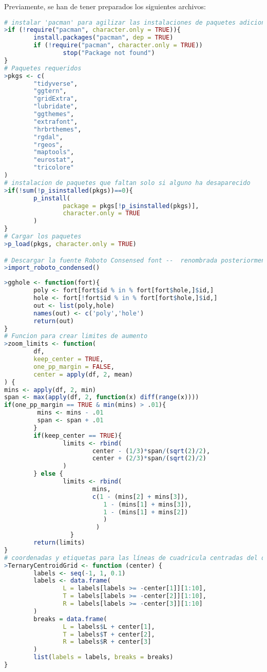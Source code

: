 \noindent Previamente, se han de tener preparados los siguientes archivos:

\begin{lstlisting}[language=R, caption=C\'odigo 0 para preparar la sesi\'on.]
# instalar 'pacman' para agilizar las instalaciones de paquetes adicionales
>if (!require("pacman", character.only = TRUE)){
        install.packages("pacman", dep = TRUE)
        if (!require("pacman", character.only = TRUE))
                stop("Package not found")
}
# Paquetes requeridos
>pkgs <- c(
        "tidyverse", 
        "ggtern",
        "gridExtra",
        "lubridate",
        "ggthemes",
        "extrafont",
        "hrbrthemes",
        "rgdal",
        "rgeos",
        "maptools",
        "eurostat",
        "tricolore"
)
# instalacion de paquetes que faltan solo si alguno ha desaparecido
>if(!sum(!p_isinstalled(pkgs))==0){
        p_install(
                package = pkgs[!p_isinstalled(pkgs)], 
                character.only = TRUE
        )
}
# Cargar los paquetes
>p_load(pkgs, character.only = TRUE)

# Descargar la fuente Roboto Consensed font --  renombrada posteriormente 'myfont'
>import_roboto_condensed()
\end{lstlisting}

\begin{lstlisting}[language=R, caption=C\'odigo 1 con las funciones propias.]
>gghole <- function(fort){
        poly <- fort[fort$id % in % fort[fort$hole,]$id,]
        hole <- fort[!fort$id % in % fort[fort$hole,]$id,]
        out <- list(poly,hole)
        names(out) <- c('poly','hole')
        return(out)
}
# Funcion para crear limites de aumento
>zoom_limits <- function(
        df, 
        keep_center = TRUE, 
        one_pp_margin = FALSE,
        center = apply(df, 2, mean)
) {
mins <- apply(df, 2, min)
span <- max(apply(df, 2, function(x) diff(range(x))))
if(one_pp_margin == TRUE & min(mins) > .01){
         mins <- mins - .01
         span <- span + .01
        }
        if(keep_center == TRUE){
                limits <- rbind(
                        center - (1/3)*span/(sqrt(2)/2),
                        center + (2/3)*span/(sqrt(2)/2)
                )
        } else {
                limits <- rbind(
                        mins,
                        c(1 - (mins[2] + mins[3]),
                           1 - (mins[1] + mins[3]),
                           1 - (mins[1] + mins[2])
                           )
                         ) 
                  }
        return(limits)
}
# coordenadas y etiquetas para las líneas de cuadricula centradas del diagrama ternario
>TernaryCentroidGrid <- function (center) {
        labels <- seq(-1, 1, 0.1)
        labels <- data.frame(
                L = labels[labels >= -center[1]][1:10],
                T = labels[labels >= -center[2]][1:10],
                R = labels[labels >= -center[3]][1:10]
        )
        breaks = data.frame(
                L = labels$L + center[1],
                T = labels$T + center[2],
                R = labels$R + center[3]
        ) 
        list(labels = labels, breaks = breaks)
}
\end{lstlisting}

